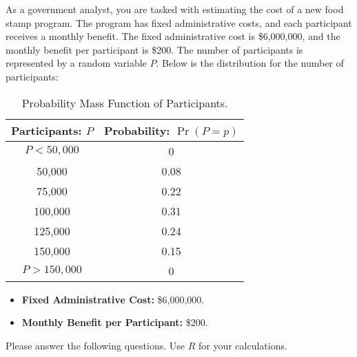 \documentclass[11pt]{article}
\begin{document}
As a government analyst, you are tasked with estimating the cost of a new food stamp program. The program has fixed administrative costs, and each participant receives a monthly benefit. The fixed administrative cost is \$6,000,000, and the monthly benefit per participant is \$200. The number of participants is represented by a random variable $P$. Below is the distribution for the number of participants:

\begin{table}[h!]
\centering
\begin{tabular}{c|c}
\hline
Participants: $P$ & Probability: $\Pr(P = p)$ \\
\hline
$P < 50,000$ & 0 \\ 50,000 & 0.08 \\ 75,000 & 0.22 \\ 100,000 & 0.31 \\ 125,000 & 0.24 \\ 150,000 & 0.15 \\ $P > 150,000$ & 0 \\
\hline
\end{tabular}
\caption{Probability Mass Function of Participants.}
\end{table}

\begin{itemize}
\item \textbf{Fixed Administrative Cost:} \$6,000,000.
\item \textbf{Monthly Benefit per Participant:} \$200.
\end{itemize}

\noindent Please answer the following questions. Use $R$ for your calculations.
\end{document}

